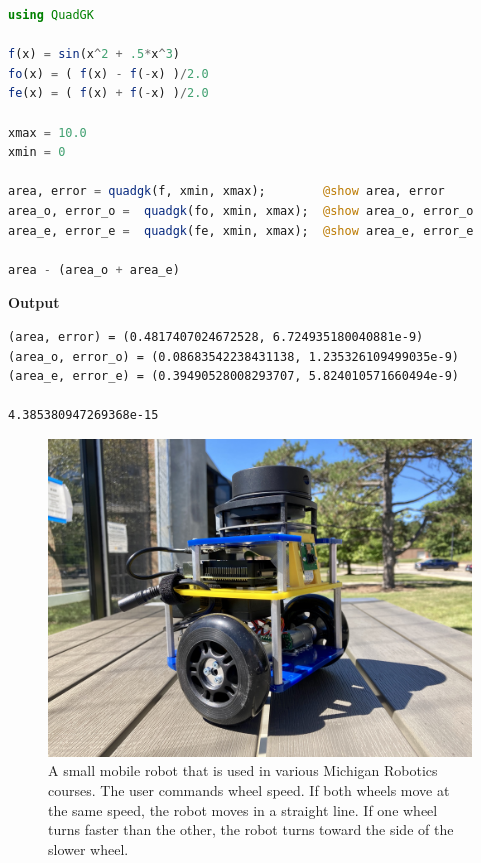 \solution

\begin{lstlisting}[language=Julia,style=mystyle]
using QuadGK

f(x) = sin(x^2 + .5*x^3)
fo(x) = ( f(x) - f(-x) )/2.0
fe(x) = ( f(x) + f(-x) )/2.0

xmax = 10.0
xmin = 0

area, error = quadgk(f, xmin, xmax);        @show area, error
area_o, error_o =  quadgk(fo, xmin, xmax);  @show area_o, error_o
area_e, error_e =  quadgk(fe, xmin, xmax);  @show area_e, error_e

area - (area_o + area_e) 
\end{lstlisting}
\textbf{Output} 
\begin{verbatim}
(area, error) = (0.4817407024672528, 6.724935180040881e-9)
(area_o, error_o) = (0.08683542238431138, 1.235326109499035e-9)
(area_e, error_e) = (0.39490528008293707, 5.824010571660494e-9)

4.385380947269368e-15
\end{verbatim}
\Qed




\begin{figure}[htb]%
\centering
\includegraphics[width=0.6\columnwidth]{graphics/Chap03/MBotROB330.jpeg}%
    \caption[]{A small mobile robot that is used in various Michigan Robotics courses. The user commands wheel speed. If both wheels move at the same speed, the robot moves in a straight line. If one wheel turns faster than the other, the robot turns toward the side of the slower wheel.}
    \label{fig:MbotRobotics}
\end{figure}

